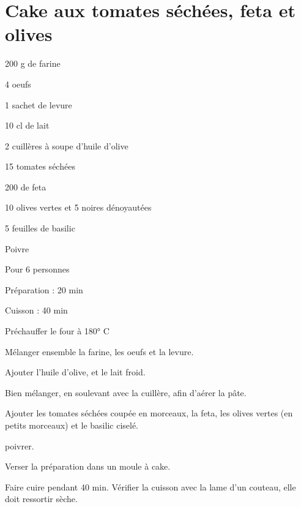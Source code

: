 \section[\normalsize{Cake aux tomates s\'ech\'ees, feta et olives}]{Cake aux tomates s\'ech\'ees, feta et olives}

\begin{ingredients}
\item 200 g de farine
\item 4 oeufs
\item 1 sachet de levure
\item 10 cl de lait
\item 2 cuill\`eres \`a soupe d'huile d'olive
\item 15 tomates s\'ech\'ees
\item 200 de feta
\item 10 olives vertes et 5 noires d\'enoyaut\'ees
\item 5 feuilles de basilic
\item Poivre
\end{ingredients}
\begin{infos}
\item Pour 6 personnes
\item Préparation : 20 min
\item Cuisson : 40 min
\end{infos}
\begin{etapes}
\item Pr\'echauffer le four \`a 180° C
\item M\'elanger ensemble la farine, les oeufs et la levure.
\item Ajouter l'huile d'olive, et le lait froid.
\item Bien m\'elanger, en soulevant avec la cuill\`ere, afin d'a\'erer la p\^ate.
\item Ajouter les tomates s\'ech\'ees coup\'ee en morceaux, la feta, les olives vertes (en petits morceaux) et le basilic cisel\'e. 
\item poivrer.
\item Verser la pr\'eparation dans un moule \`a cake.
\item Faire cuire pendant 40 min. V\'erifier la cuisson avec la lame d'un couteau, elle doit ressortir s\`eche.
\end{etapes}
\begin{conseils}
\end{conseils}